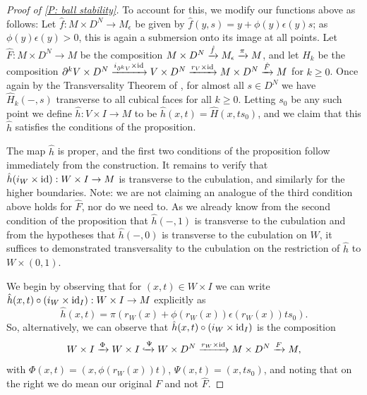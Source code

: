 \begin{proof}[Proof of \cref{P: ball stability}]
To account for this, we modify our functions above as follows: Let $\hat f: M\times D^N\to M_\epsilon$ be given by $\hat f(y, s)=y +\phi(y) \epsilon(y) s$; as $\phi(y)\epsilon(y)>0$, this is again a submersion onto its image at all points. Let  $\hat F:M\times D^N\to M$ be the composition $M\times D^N\xrightarrow{\hat f}M_\epsilon \xrightarrow{\pi}M$, and let  $\hat H_k$ be the composition $\partial^kV\times D^N\xrightarrow{i_{\partial^kV}\times \mathrm{id}}V\times D^N\xrightarrow{r_V\times \mathrm{id}} M\times D^N\xrightarrow{\hat F} M$ for $k\geq 0$. Once again by the Transversality Theorem of \cite[Section 2.3]{GuPo74}, for almost all $s\in D^N$ we have $\hat H_k(-,s)$ transverse to all cubical faces for all $k\geq 0$. Letting $s_0$ be any such point we define $\hat h:V\times I\to M$ to be  $\hat h(x,t)=\hat H(x,ts_0)$, and we claim that this $\hat h$ satisfies the conditions of the proposition.

The map $\hat h$ is proper, and the first two conditions of the proposition follow immediately from the construction. It remains to verify that $\hat h (i_W\times \mathrm{id}):W\times I\to M$ is transverse to the cubulation, and similarly for the higher boundaries. Note: we are not claiming an analogue of the third condition above holds for $\hat F$, nor do we need to. As we already know from the second condition of the proposition that $\hat h(-,1)$ is transverse to the cubulation and from the hypotheses that  $\hat h(-,0)$  is transverse to the cubulation on $W$, it suffices to demonstrated transversality to the cubulation on the restriction of $\hat h$ to $W\times (0,1)$.

We begin by observing that for $(x,t)\in W\times I$ we can write $\hat h(x,t)\circ (i_W\times \mathrm{id}_I):W\times I\to M$ explicitly as
$$\hat h(x,t)=\pi(r_W(x)+\phi(r_W(x))\epsilon(r_W(x))ts_0).$$
So, alternatively, we can observe that $\hat h(x,t)\circ (i_W\times \mathrm{id}_I)$ is the composition
\begin{equation}\label{E: alt hat h}
W\times I\xrightarrow{\Phi} W\times I \xhookrightarrow{\Psi} W\times D^N \xrightarrow{r_W\times \mathrm{id}} M\times D^N\xrightarrow{F} M,
\end{equation}
with $\Phi(x,t)=(x,\phi(r_W(x))t)$, $\Psi(x,t)=(x,ts_0)$, and noting that on the right we do mean our original $F$ and not $\hat F$.


\end{proof}
